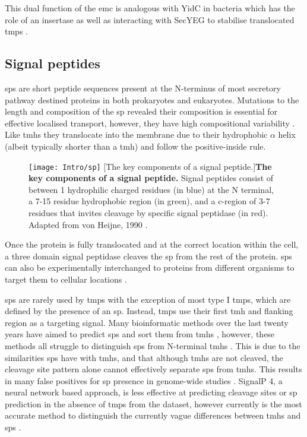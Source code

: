 This dual function of the \gls{emc} is analogous with YidC \cite{Shurtleff2018} in bacteria which has the role of an insertase \cite{Samuelson2000, Drew2003, Dalbey2014} as well as interacting with SecYEG to stabilise translocated \gls{tmp}s \cite{Nagamori2004}.

\subsection{Signal peptides}
\gls{sp}s are short peptide sequences present at the N-terminus of most secretory pathway destined proteins in both prokaryotes and eukaryotes.
Mutations to the length and composition of the \gls{sp} revealed their composition is essential for effective localised transport, however, they have high compositional variability \cite{VonHeijne1985}.
Like \gls{tmh}s they translocate into the membrane due to their hydrophobic $\alpha$ helix (albeit typically shorter than a \gls{tmh}) and follow the positive\--inside rule.

\begin{figure}[ht]
\centering
\texttt{[image: Intro/sp]}
		[The key components of a signal peptide.]{\textbf{The key components of a signal peptide.}
		Signal peptides consist of between 1 hydrophilic charged residues (in blue) at the N terminal, a 7-15 residue hydrophobic region (in green), and a c-region of 3-7 residues that invites cleavage by specific signal peptidase (in red).
	Adapted from von Heijne, 1990 \cite{VonHeijne1990}.
		}
\label{fig:sp}
\end{figure}


Once the protein is fully translocated and at the correct location within the cell, a three domain signal peptidase cleaves the \gls{sp} from the rest of the protein.
\gls{sp}s can also be experimentally interchanged to proteins from different organisms to target them to cellular locations \cite{Izard1994, Gierasch1989}.

\gls{sp}s are rarely used by \gls{tmp}s with the exception of most type I \gls{tmp}s, which are defined by the presence of an \gls{sp}.
Instead, \gls{tmp}s use their first \gls{tmh} and flanking region as a targeting signal.
Many bioinformatic methods over the last twenty years have aimed to predict \gls{sp}s and sort them from \gls{tmh}s \cite{Choo2009}, however, these methods all struggle to distinguish \gls{sp}s from N-terminal \gls{tmh}s \cite{Petersen2011}.
This is due to the similarities \gls{sp}s have with \gls{tmh}s, and that although \gls{tmh}s are not cleaved, the cleavage site pattern alone cannot effectively separate \gls{sp}s from \gls{tmh}s.
This results in many false positives for \gls{sp} presence in genome\--wide studies \cite{Petersen2011}.
SignalP 4, a neural network based approach, is less effective at predicting cleavage sites or \gls{sp} prediction in the absence of \gls{tmp}s from the dataset, however currently is the most accurate method to distinguish the currently vague differences between \gls{tmh}s and \gls{sp}s \cite{Petersen2011}.

